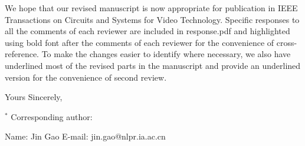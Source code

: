 \begin{letter}{}
We hope that our revised manuscript is now appropriate for publication in IEEE Transactions on Circuits and Systems for Video Technology. Specific responses to all the comments of each reviewer are included in response.pdf and highlighted using bold font after the comments of each reviewer for the convenience of cross-reference. To make the changes easier to identify where necessary, we also have underlined most of the revised parts in the manuscript and provide an underlined version for the convenience of second review.

\vspace{2\parskip}
\closing{Yours Sincerely,}
\vspace{5mm}
$^*$ Corresponding author:
\vspace{-2mm}

Name: Jin Gao   \quad\quad  E-mail: jin.gao@nlpr.ia.ac.cn
\end{letter}



